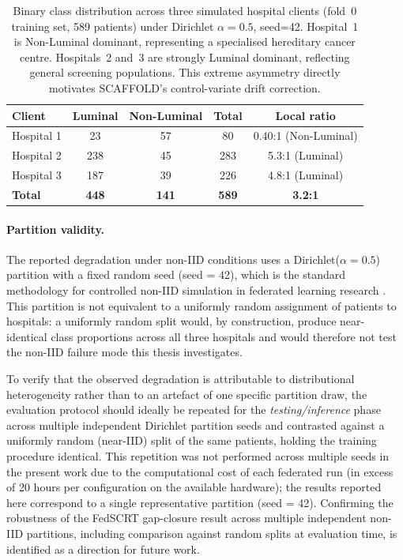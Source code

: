 \begin{table}[htbp]
  \centering
  \caption{Binary class distribution across three simulated
    hospital clients (fold~0 training set, 589 patients)
    under Dirichlet $\alpha=0.5$, seed=42.
    Hospital~1 is Non-Luminal dominant, representing a
    specialised hereditary cancer centre.
    Hospitals~2 and~3 are strongly Luminal dominant,
    reflecting general screening populations.
    This extreme asymmetry directly motivates SCAFFOLD's
    control-variate drift correction.}
  \label{tab:client-partition}
  \renewcommand{\arraystretch}{1.3}
  \begin{tabular}{lcccc}
    \toprule
    \textbf{Client} & \textbf{Luminal}
      & \textbf{Non-Luminal} & \textbf{Total}
      & \textbf{Local ratio} \\
    \midrule
    Hospital 1 & 23  & 57  & 80  & 0.40:1 (Non-Luminal) \\
    Hospital 2 & 238 & 45  & 283 & 5.3:1 (Luminal) \\
    Hospital 3 & 187 & 39  & 226 & 4.8:1 (Luminal) \\
    \midrule
    \textbf{Total} & \textbf{448} & \textbf{141}
      & \textbf{589} & \textbf{3.2:1} \\
    \bottomrule
  \end{tabular}
\end{table}

\paragraph{Partition validity.}
The reported degradation under non-IID conditions uses a
Dirichlet($\alpha=0.5$) partition with a fixed random
seed (seed = 42), which is the standard methodology for
controlled non-IID simulation in federated learning
research \cite{kairouz2021advances}.
This partition is not equivalent to a uniformly random
assignment of patients to hospitals: a uniformly random
split would, by construction, produce near-identical
class proportions across all three hospitals and would
therefore not test the non-IID failure mode this thesis
investigates.

To verify that the observed degradation is attributable
to distributional heterogeneity rather than to an
artefact of one specific partition draw, the evaluation
protocol should ideally be repeated for the
\emph{testing/inference} phase across multiple
independent Dirichlet partition seeds and contrasted
against a uniformly random (near-IID) split of the same
patients, holding the training procedure identical.
This repetition was not performed across multiple seeds
in the present work due to the computational cost of
each federated run (in excess of 20 hours per
configuration on the available hardware); the results
reported here correspond to a single representative
partition (seed = 42).
Confirming the robustness of the FedSCRT gap-closure
result across multiple independent non-IID partitions,
including comparison against random splits at evaluation
time, is identified as a direction for future work.

